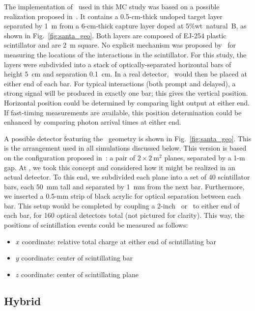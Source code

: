 The implementation of \santa\ used in this MC study was based on a possible realization proposed in~\cite{Safdi:2014hwa}. It contains a 0.5-cm-thick undoped target layer separated by 1~m from a 6-cm-thick capture layer doped at 5\%wt~natural~B, as shown in Fig.~\ref{fig:santa_geo}. Both layers are composed of EJ-254 plastic scintillator and are 2~m square.
No explicit mechanism was proposed by~\cite{Safdi:2014hwa} for measuring the locations of the interactions in the scintillator. For this study, the layers were subdivided into a stack of optically-separated horizontal bars of height 5~cm and separation 0.1~cm. In a real detector, \pmts\ would then be placed at either end of each bar.
For typical interactions (both prompt and delayed), a strong signal will be produced in exactly one bar; this gives the vertical position. Horizontal position could be determined by comparing light output at either end. If fast-timing measurements are available, this position determination could be enhanced by comparing photon arrival times at either end.

A possible detector featuring the \santa\ geometry is shown in Fig.~\ref{fig:santa_geo}.
This is the arrangement used in all simulations discussed below.
This version is based on the configuration proposed in~\cite{Safdi:2014hwa}: a pair of $2 \times 2~\mathrm{m}^{2}$ planes, separated by a 1-m gap.
At \uh, we took this concept and considered how it might be realized in an actual detector.
To this end, we subdivided each plane into a set of 40 scintillator bars, each 50~mm tall and separated by 1~mm from the next bar.
Furthermore, we inserted a 0.5-mm strip of black acrylic for optical separation between each bar.
This setup would be completed by coupling a 2-inch \pmt\ or \sipm\ to either end of each bar, for 160 optical detectors total (not pictured for clarity).
This way, the positions of scintillation events could be measured as follows:
\begin{itemize}
  \item $x$ coordinate: relative total charge at either end of scintillating bar
  \item $y$ coordinate: center of scintillating bar
  \item $z$ coordinate: center of scintillating plane
\end{itemize}


\subsection{\label{subsec:hyb}Hybrid}

